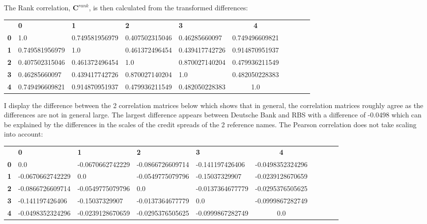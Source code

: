 \documentclass{report}
\theoremstyle{plain}
\theoremstyle{definition}
\begin{document}
The Rank correlation, $\mathbf{C}^{rank}$, is then calculated from the transformed differences:

\begin{center}
	\begin{tabular}{|l|l|l|l|l|c|c|c|c|c|}
		\hline
		& \textbf{0} & \textbf{1} & \textbf{2} & \textbf{3} & \textbf{4}\\\hhline{|=|=|=|=|=|=|}
		\textbf{0} & 1.0 & 0.749581956979 & 0.407502315046 & 0.46285660097 & 0.749496609821\\
		\textbf{1} & 0.749581956979 & 1.0 & 0.461372496454 & 0.439417742726 & 0.914870951937\\
		\textbf{2} & 0.407502315046 & 0.461372496454 & 1.0 & 0.870027140204 & 0.479936211549\\
		\textbf{3} & 0.46285660097 & 0.439417742726 & 0.870027140204 & 1.0 & 0.482050228383\\
		\textbf{4} & 0.749496609821 & 0.914870951937 & 0.479936211549 & 0.482050228383 & 1.0\\
		\hline
	\end{tabular}
\end{center}

I display the difference between the 2 correlation matrices below which shows that in general, the correlation matrices roughly agree as the differences are not in general large. The  largest difference appears between Deutsche Bank and RBS with a difference of -0.0498 which can be explained by the differences in the scales of the credit spreads of the 2 reference names. The Pearson correlation does not take scaling into account:

\begin{center}
	\begin{tabular}{|l|l|l|l|l|c|c|c|c|c|}
		\hline
		& \textbf{0} & \textbf{1} & \textbf{2} & \textbf{3} & \textbf{4}\\\hhline{|=|=|=|=|=|=|}
		\textbf{0} & 0.0 & -0.0670662742229 & -0.0866726609714 & -0.141197426406 & -0.0498352324296\\
		\textbf{1} & -0.0670662742229 & 0.0 & -0.0549775079796 & -0.15037329907 & -0.0239128670659\\
		\textbf{2} & -0.0866726609714 & -0.0549775079796 & 0.0 & -0.0137364677779 & -0.0295376505625\\
		\textbf{3} & -0.141197426406 & -0.15037329907 & -0.0137364677779 & 0.0 & -0.0999867282749\\
		\textbf{4} & -0.0498352324296 & -0.0239128670659 & -0.0295376505625 & -0.0999867282749 & 0.0\\
		\hline
	\end{tabular}
\end{center}
\end{document}
